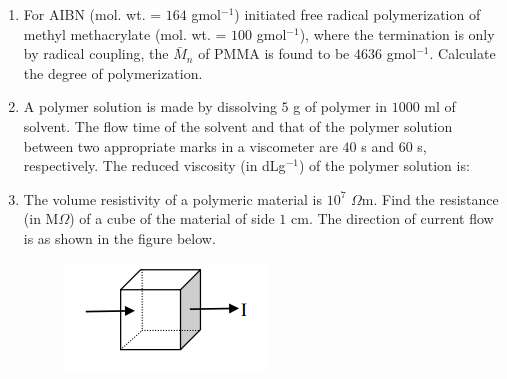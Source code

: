 \documentclass[a4paper,10pt]{article}
\begin{document}
\begin{enumerate}
    \item For AIBN (mol. wt. = $164$ gmol$^{-1}$) initiated free radical polymerization of methyl methacrylate (mol. wt. = $100$ gmol$^{-1}$), where the termination is only by radical coupling, the $\bar{M}_n$ of PMMA is found to be $4636$ gmol$^{-1}$. Calculate the degree of polymerization.
    
    \hfill{}
    
    \item A polymer solution is made by dissolving $5$ g of polymer in $1000$ ml of solvent. The flow time of the solvent and that of the polymer solution between two appropriate marks in a viscometer are $40$ s and $60$ s, respectively. The reduced viscosity (in dLg$^{-1}$) of the polymer solution is:
    
    \hfill{}
    \begin{enumerate}
    \end{enumerate}
    
    \item The volume resistivity of a polymeric material is $10^7$ $\Omega$m. Find the resistance (in M$\Omega$) of a cube of the material of side $1$ cm. The direction of current flow is as shown in the figure below.
    \begin{figure}[H] \centering \includegraphics[width=0.2\columnwidth]{q22_poly.png} \caption*{} \label{fig:q22_poly} \end{figure}
    
    \hfill{}
\end{enumerate}
\clearpage
\end{document}

